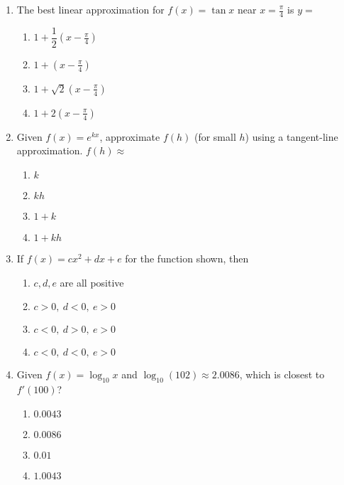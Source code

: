 \documentclass[12pt]{article}
\begin{document}
\begin{enumerate}[label=\textbf{A\arabic*.},resume]
\item The best linear approximation for $f(x)=\tan x$ near $x=\tfrac{\pi}{4}$ is $y=$
\begin{enumerate}[label=(\Alph*)]
\item $1+\dfrac12\!\left(x-\tfrac{\pi}{4}\right)$
\item $1+\left(x-\tfrac{\pi}{4}\right)$
\item $1+\sqrt{2}\!\left(x-\tfrac{\pi}{4}\right)$
\item $1+2\!\left(x-\tfrac{\pi}{4}\right)$
\end{enumerate}

\item Given $f(x)=e^{kx}$, approximate $f(h)$ (for small $h$) using a tangent-line approximation. $f(h)\approx$
\begin{enumerate}[label=(\Alph*)]
\item $k$ \item $kh$ \item $1+k$ \item $1+kh$
\end{enumerate}

\item If $f(x)=cx^{2}+dx+e$ for the function shown, then
\begin{center}
\end{center}
\begin{enumerate}[label=(\Alph*)]
\item $c,d,e$ are all positive
\item $c>0,\ d<0,\ e>0$
\item $c<0,\ d>0,\ e>0$
\item $c<0,\ d<0,\ e>0$
\end{enumerate}

\item Given $f(x)=\log_{10}x$ and $\log_{10}(102)\approx 2.0086$, which is closest to $f'(100)$?
\begin{enumerate}[label=(\Alph*)]
\item $0.0043$ \item $0.0086$ \item $0.01$ \item $1.0043$
\end{enumerate}

\end{enumerate}
\end{document}
